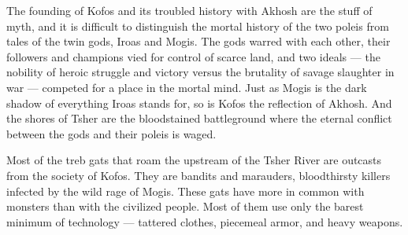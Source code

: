     The founding of Kofos and its troubled history with Akhosh are the stuff of myth, and it is difficult to distinguish the mortal history of the two poleis from tales of the twin gods, Iroas and Mogis.
    The gods warred with each other, their followers and champions vied for control of scarce land, and two ideals --- the nobility of heroic struggle and victory versus the brutality of savage slaughter in war --- competed for a place in the mortal mind.
    Just as Mogis is the dark shadow of everything Iroas stands for, so is Kofos the reflection of Akhosh.
    And the shores of Tsher are the bloodstained battleground where the eternal conflict between the gods and their poleis is waged.

    Most of the treb gats that roam the upstream of the Tsher River are outcasts from the society of Kofos.
    They are bandits and marauders, bloodthirsty killers infected by the wild rage of Mogis.
    These gats have more in common with monsters than with the civilized people.
    Most of them use only the barest minimum of technology --- tattered clothes, piecemeal armor, and heavy weapons. %

\newpage
